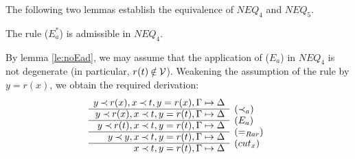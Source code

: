 The following two lemmas establish the equivalence of
  $NEQ_4$ and $NEQ_5$.

\begin{LEMMA}\label{le:Ea*}
The rule ($E_a^*$) is admissible in $NEQ_4$.
\end{LEMMA}
\begin{PROOF}
By lemma \ref{le:noEad}, we may assume that the application of ($E_a$) in
$NEQ_4$ is not degenerate (in particular, $r(t)\not\in\Vars$).
Weakening the assumption of the rule by $y=r(x)$, we obtain the required
derivation:
\[ \begin{array}{rl}
 y\Incl r(x), x\Incl t, y=r(x), \GSD \\ \cline{1-1}
 y\Incl r(x), x\Incl t, y=r(t), \GSD & \rabove{(\Incl_a)} \\ \cline{1-1}
 y\Incl r(t), x\Incl t, y=r(t), \GSD & \rabove{(E_a)} \\ \cline{1-1}
 y\Incl y, x\Incl t, y=r(t), \GSD & \rabove{(=_{Rar})} \\ \cline{1-1}
 x\Incl t, y=r(t), \GSD & \rabove{(cut_x)} \end{array} \]
\end{PROOF}

